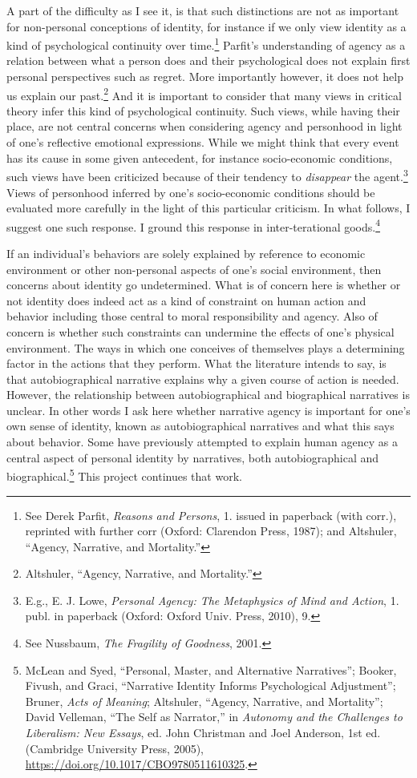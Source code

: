 \documentclass[phdthesis,12pt,final,a4paper]{wuthesis}
\theoremstyle{definition}
\theoremstyle{definition}
\theoremstyle{definition}
\theoremstyle{definition}
\theoremstyle{remark}
\begin{document}
A part of the difficulty as I see it, is that such distinctions are not as important for non-personal conceptions of identity, for instance if we only view identity as a kind of psychological continuity over time.\footnote{See Derek Parfit, \emph{Reasons and Persons}, 1. issued in paperback (with corr.), reprinted with further corr (Oxford: Clarendon Press, 1987); and Altshuler, {``Agency, Narrative, and Mortality.''}} Parfit's understanding of agency as a relation between what a person does and their psychological does not explain first personal perspectives such as regret. More importantly however, it does not help us explain our past.\footnote{Altshuler, {``Agency, Narrative, and Mortality.''}} And it is important to consider that many views in critical theory infer this kind of psychological continuity. Such views, while having their place, are not central concerns when considering agency and personhood in light of one's reflective emotional expressions. While we might think that every event has its cause in some given antecedent, for instance socio-economic conditions, such views have been criticized because of their tendency to \emph{disappear} the agent.\footnote{E.g., E. J. Lowe, \emph{Personal Agency: The Metaphysics of Mind and Action}, 1. publ. in paperback (Oxford: Oxford Univ. Press, 2010), 9.} Views of personhood inferred by one's socio-economic conditions should be evaluated more carefully in the light of this particular criticism. In what follows, I suggest one such response. I ground this response in inter-terational goods.\footnote{See Nussbaum, \emph{The {Fragility} of {Goodness}}, 2001.}

If an individual's behaviors are solely explained by reference to economic environment or other non-personal aspects of one's social environment, then concerns about identity go undetermined. What is of concern here is whether or not identity does indeed act as a kind of constraint on human action and behavior including those central to moral responsibility and agency. Also of concern is whether such constraints can undermine the effects of one's physical environment. The ways in which one conceives of themselves plays a determining factor in the actions that they perform. What the literature intends to say, is that autobiographical narrative explains why a given course of action is needed. However, the relationship between autobiographical and biographical narratives is unclear. In other words I ask here whether narrative agency is important for one's own sense of identity, known as autobiographical narratives and what this says about behavior. Some have previously attempted to explain human agency as a central aspect of personal identity by narratives, both autobiographical and biographical.\footnote{McLean and Syed, {``Personal, {Master}, and {Alternative Narratives}''}; Booker, Fivush, and Graci, {``Narrative Identity Informs Psychological Adjustment''}; Bruner, \emph{Acts of Meaning}; Altshuler, {``Agency, Narrative, and Mortality''}; David Velleman, {``The {Self} as {Narrator},''} in \emph{Autonomy and the {Challenges} to {Liberalism}: {New Essays}}, ed. John Christman and Joel Anderson, 1st ed. (Cambridge University Press, 2005), \url{https://doi.org/10.1017/CBO9780511610325}.} This project continues that work.
\end{document}

